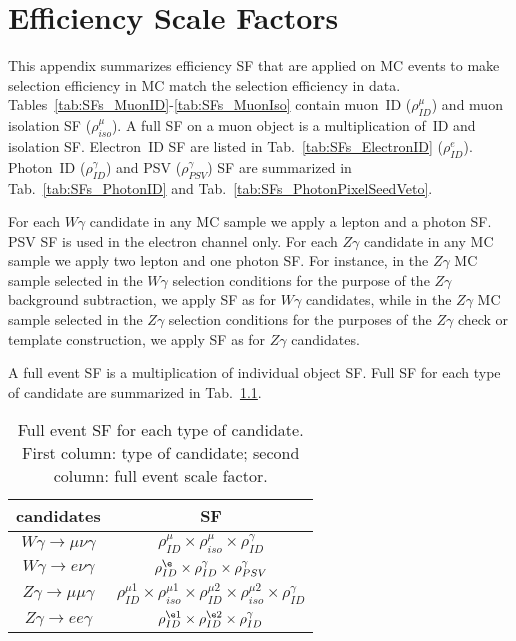 \chapter{Efficiency Scale Factors}
\label{sec:SFsTables}

This appendix summarizes efficiency SF that are applied on MC events to make selection efficiency in MC match the selection efficiency in data. Tables~\ref{tab:SFs_MuonID}-\ref{tab:SFs_MuonIso} contain muon~ID ($\rho^{\mu}_{ID}$) and muon isolation SF ($\rho^{\mu}_{iso}$). A full SF on a muon object is a multiplication of~ID and isolation SF. Electron~ID SF are listed in Tab.~\ref{tab:SFs_ElectronID} ($\rho^{e}_{ID}$). Photon~ID ($\rho^{\gamma}_{ID}$) and PSV ($\rho^{\gamma}_{PSV}$) SF are summarized in Tab.~\ref{tab:SFs_PhotonID} and Tab.~\ref{tab:SFs_PhotonPixelSeedVeto}.

For each $W\gamma$ candidate in any MC sample we apply a lepton and a photon SF. PSV SF is used in the electron channel only. For each $Z\gamma$ candidate in any MC sample we apply two lepton and one photon SF. For instance, in the $Z\gamma$ MC sample selected in the $W\gamma$ selection conditions for the purpose of the $Z\gamma$ background subtraction, we apply SF as for $W\gamma$ candidates, while in the $Z\gamma$ MC sample selected in the $Z\gamma$ selection conditions for the purposes of the $Z\gamma$ check or template construction, we apply SF as for $Z\gamma$ candidates.

A full event SF is a multiplication of individual object SF. Full SF for each type of candidate are summarized in Tab.~\ref{tab:SFs_Applied}.

\begin{table}[h]
  \footnotesize
  \begin{center}
  \caption{Full event SF for each type of candidate. First column: type of candidate; second column: full event scale factor.} 
   \begin{tabular}{|c|c|}
 candidates                          & SF\\ \hline
 $W\gamma\rightarrow\mu\nu\gamma$   &   $\rho^{\mu}_{ID} \times \rho^{\mu}_{iso} \times \rho^{\gamma}_{ID}$    \\ \hline
 $W\gamma\rightarrow e\nu\gamma$    &   $\rho^{\e}_{ID} \times \rho^{\gamma}_{ID}\times \rho^{\gamma}_{PSV}$       \\ \hline
 $Z\gamma\rightarrow\mu\mu\gamma$   &   $\rho^{\mu1}_{ID} \times \rho^{\mu1}_{iso} \times \rho^{\mu2}_{ID} \times \rho^{\mu2}_{iso} \times \rho^{\gamma}_{ID}$      \\ \hline
 $Z\gamma\rightarrow ee\gamma$      &   $\rho^{\e1}_{ID} \times \rho^{\e2}_{ID} \times \rho^{\gamma}_{ID}$      \\ \hline
  \end{tabular}
  \label{tab:SFs_Applied}
  \end{center}
\end{table}

